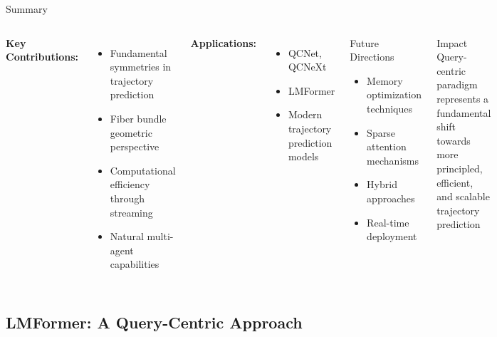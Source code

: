 \documentclass[10pt,aspectratio=169]{beamer}
\begin{document}
\begin{frame}{Summary}
\begin{columns}[T]
\textbf{Key Contributions:}
\begin{itemize}
    \item Fundamental symmetries in trajectory prediction
    \item Fiber bundle geometric perspective
    \item Computational efficiency through streaming
    \item Natural multi-agent capabilities
\end{itemize}

\textbf{Applications:}
\begin{itemize}
    \item QCNet, QCNeXt
    \item LMFormer
    \item Modern trajectory prediction models
\end{itemize}

\begin{block}{Future Directions}
\begin{itemize}
    \item Memory optimization techniques
    \item Sparse attention mechanisms
    \item Hybrid approaches
    \item Real-time deployment
\end{itemize}
\end{block}

\begin{alertblock}{Impact}
Query-centric paradigm represents a fundamental shift towards more principled, efficient, and scalable trajectory prediction
\end{alertblock}
\end{columns}
\end{frame}



\subsection{LMFormer: A Query-Centric Approach}
\end{document}

